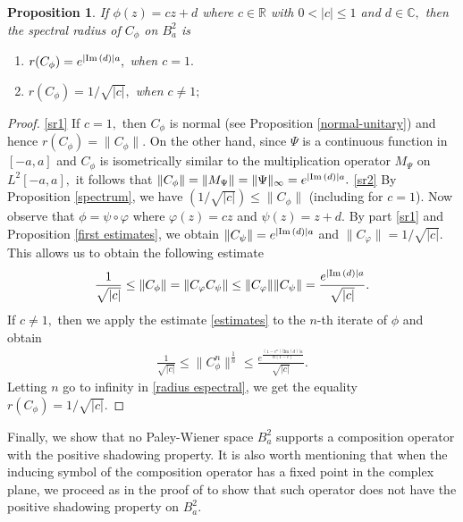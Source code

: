 \documentclass[11pt]{amsart}%
\numberwithin{equation}{section}
\theoremstyle{plain}
\newtheorem{prop}[thm]{Proposition}
\theoremstyle{definition}
\theoremstyle{definition}
\newcommand{\im}{{\rm Im}\,}
\begin{document}
\begin{prop} \label{radius}
If $\phi(z)=cz+d$ where $c\in \mathbb{R}$ with $0<|c|\leq  1$ and $d\in \mathbb{C},$ then the spectral radius of $C_{\phi}$ on $B^2_a$ is 
\begin{enumerate}[label=\textnormal{(\arabic*)}]
\item \label{sr1}$r(C_{\phi})=e^{|\im(d)|a},$ when $c=1.$
\item \label{sr2} $r(C_{\phi})=1/\sqrt{|c|},$ when $c\neq 1;$
\end{enumerate}
\end{prop}
\begin{proof} \ref{sr1} If $c=1,$ then $C_{\phi}$ is normal (see Proposition \ref{normal-unitary}) and hence $r(C_{\phi})=\|C_{\phi}\|.$ On the other hand, since $\Psi$ is a continuous function in $[-a,a]$ and  $C_{\phi}$ is isometrically similar to the multiplication operator $M_{\Psi}$ on $L^2[-a,a],$ it follows that $\|C_{\phi}\|=\|M_{\Psi}\|=\|\Psi\|_{\infty}=e^{|\im(d)|a}.$ \ref{sr2} By Proposition  \ref{spectrum}, we have $(1/\sqrt{|c|})\leq \|C_{\phi}\|$ (including for $c=1$).  Now observe that $\phi=\psi\circ \varphi$ where $\varphi(z)=cz$ and $\psi(z)=z+d.$ By part \ref{sr1} and Proposition \ref{first estimates}, we obtain  $\|C_{\psi}\|=e^{|\im(d)|a}$ and $\|C_{\varphi}\|=1/\sqrt{|c|}.$ This allows us to obtain the following estimate
\begin{align}\label{estimates}
\frac{1}{\sqrt{|c|}}\leq \|C_{\phi}\|=\|C_{\varphi}C_{\psi}\|\leq \|C_{\varphi}\|\|C_{\psi}\|=\frac{e^{|\im(d)|a}}{\sqrt{|c|}}.
\end{align}
 If $c\neq1,$ then we apply the estimate \eqref{estimates} to the $n$-th iterate of $\phi$ and obtain
\begin{align}\label{radius espectral}
\frac{1}{\sqrt{|c|}}\leq \|C_{\phi}^n\|^{\frac {1}{n}}\leq \frac{  e^{   \frac{(1-c^n)|\mathrm{Im}(d)|a}{n(1-c)}   }         }{\sqrt{|c|}}.
\end{align}
Letting $n$ go to infinity in \eqref{radius espectral},  we get the equality $r(C_{\phi})=1/\sqrt{|c|}.$ 
\end{proof}




Finally, we show that no Paley-Wiener space $B^2_a$ supports a composition operator with the positive shadowing property. It is also worth mentioning that when the inducing symbol of the composition operator has a fixed point in the complex plane, we proceed as in the proof of \cite[Proposition~1]{Alvarez} to show that such operator does not have the positive shadowing property on $B^2_a$.
\end{document}
